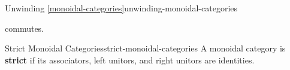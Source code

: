 \begin{remark}{Unwinding \cref{monoidal-categories}}{unwinding-monoidal-categories}
\begin{enumerate}
\begin{webcompile}
%
            \end{webcompile}
            commutes.
    \end{enumerate}
\end{remark}
\begin{definition}{Strict Monoidal Categories}{strict-monoidal-categories}%
    A monoidal category is \textbf{strict} if its associators, left unitors, and right unitors are identities.
\end{definition}
